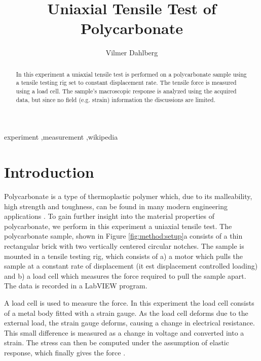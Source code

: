 \documentclass[5p,a4paper]{elsarticle}
\newcommand{\reporttitle}{Uniaxial Tensile Test of Polycarbonate}
\newcommand{\course}{Modern Experimental Mechanics}
\newcommand{\studentname}{Vilmer Dahlberg}
\newcommand{\institution}{Department of Construction Sciences,  Lund University}
\begin{document}
	
	\begin{frontmatter}
	
		\title{\reporttitle}
		\author{\studentname}
		\address{\course\\\institution}
		
		\begin{abstract}
			In this experiment a uniaxial tensile test is performed on a polycarbonate sample using a tensile testing rig set to constant displacement rate. The tensile force is measured using a load cell. The sample's macroscopic response is analyzed using the acquired data, but since no field (e.g. strain) information the discussions are limited.
		\end{abstract}
		
		\begin{keyword}
			experiment \sep measurement \sep wikipedia
		\end{keyword}
	
	\end{frontmatter}
	
	\section{Introduction}
	Polycarbonate is a type of thermoplastic polymer which, due to its malleability, high strength and toughness, can be found in many modern engineering applications \cite{wikipedia_polycarbonate}. To gain further insight into the material properties of polycarbonate, we perform in this experiment a uniaxial tensile test. The polycarbonate sample, shown in Figure \ref{fig:method:setup}a consists of a thin rectangular brick with two vertically centered circular notches. The sample is mounted in a tensile testing rig, which consists of a) a motor which pulls the sample at a constant rate of displacement (it est displacement controlled loading) and b) a load cell which measures the force required to pull the sample apart. The data is recorded in a LabVIEW \cite{national_instruments_labview_2017} program.
	
	A load cell is used to measure the force. In this experiment the load cell consists of a metal body fitted with a strain gauge. As the load cell deforms due to the external load, the strain gauge deforms, causing a change in electrical resistance. This small difference is measured as a change in voltage and converted into a strain. The stress can then be computed under the assumption of elastic response, which finally gives the force \cite{wikipedia_load_cell}.
	
\end{document}
